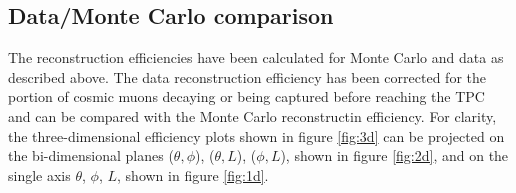 \documentclass[a4paper,11pt]{article}
\begin{document}



\subsection{Data/Monte Carlo comparison}\label{sec:datamc}
The reconstruction efficiencies have been calculated for Monte Carlo and data as described above. The data reconstruction efficiency has been corrected for the portion of cosmic muons decaying or being captured before reaching the TPC and can be compared with the Monte Carlo reconstructin efficiency.
For clarity, the three-dimensional efficiency plots shown in figure \ref{fig:3d} can be projected on the bi-dimensional planes ($\theta,\phi$), ($\theta,L$), ($\phi,L$), shown in figure \ref{fig:2d}, and on the single axis $\theta$, $\phi$, $L$, shown in figure \ref{fig:1d}.
\end{document}
